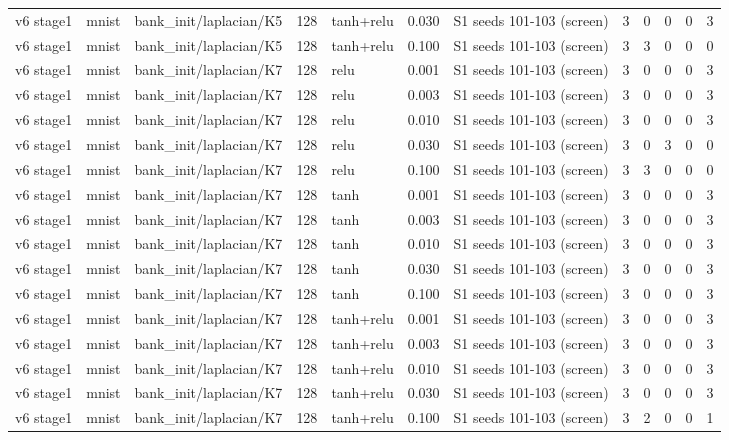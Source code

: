 \begin{table}[htbp]
{\begin{tabular}{@{}lllrlrlrrrrr@{}}
v6 stage1 & mnist & bank\_init/laplacian/K5 & 128 & tanh+relu & 0.030 & S1 seeds 101-103 (screen) & 3 & 0 & 0 & 0 & 3 \\
v6 stage1 & mnist & bank\_init/laplacian/K5 & 128 & tanh+relu & 0.100 & S1 seeds 101-103 (screen) & 3 & 3 & 0 & 0 & 0 \\
v6 stage1 & mnist & bank\_init/laplacian/K7 & 128 & relu & 0.001 & S1 seeds 101-103 (screen) & 3 & 0 & 0 & 0 & 3 \\
v6 stage1 & mnist & bank\_init/laplacian/K7 & 128 & relu & 0.003 & S1 seeds 101-103 (screen) & 3 & 0 & 0 & 0 & 3 \\
v6 stage1 & mnist & bank\_init/laplacian/K7 & 128 & relu & 0.010 & S1 seeds 101-103 (screen) & 3 & 0 & 0 & 0 & 3 \\
v6 stage1 & mnist & bank\_init/laplacian/K7 & 128 & relu & 0.030 & S1 seeds 101-103 (screen) & 3 & 0 & 3 & 0 & 0 \\
v6 stage1 & mnist & bank\_init/laplacian/K7 & 128 & relu & 0.100 & S1 seeds 101-103 (screen) & 3 & 3 & 0 & 0 & 0 \\
v6 stage1 & mnist & bank\_init/laplacian/K7 & 128 & tanh & 0.001 & S1 seeds 101-103 (screen) & 3 & 0 & 0 & 0 & 3 \\
v6 stage1 & mnist & bank\_init/laplacian/K7 & 128 & tanh & 0.003 & S1 seeds 101-103 (screen) & 3 & 0 & 0 & 0 & 3 \\
v6 stage1 & mnist & bank\_init/laplacian/K7 & 128 & tanh & 0.010 & S1 seeds 101-103 (screen) & 3 & 0 & 0 & 0 & 3 \\
v6 stage1 & mnist & bank\_init/laplacian/K7 & 128 & tanh & 0.030 & S1 seeds 101-103 (screen) & 3 & 0 & 0 & 0 & 3 \\
v6 stage1 & mnist & bank\_init/laplacian/K7 & 128 & tanh & 0.100 & S1 seeds 101-103 (screen) & 3 & 0 & 0 & 0 & 3 \\
v6 stage1 & mnist & bank\_init/laplacian/K7 & 128 & tanh+relu & 0.001 & S1 seeds 101-103 (screen) & 3 & 0 & 0 & 0 & 3 \\
v6 stage1 & mnist & bank\_init/laplacian/K7 & 128 & tanh+relu & 0.003 & S1 seeds 101-103 (screen) & 3 & 0 & 0 & 0 & 3 \\
v6 stage1 & mnist & bank\_init/laplacian/K7 & 128 & tanh+relu & 0.010 & S1 seeds 101-103 (screen) & 3 & 0 & 0 & 0 & 3 \\
v6 stage1 & mnist & bank\_init/laplacian/K7 & 128 & tanh+relu & 0.030 & S1 seeds 101-103 (screen) & 3 & 0 & 0 & 0 & 3 \\
v6 stage1 & mnist & bank\_init/laplacian/K7 & 128 & tanh+relu & 0.100 & S1 seeds 101-103 (screen) & 3 & 2 & 0 & 0 & 1 \\

\end{tabular}}
\end{table}
